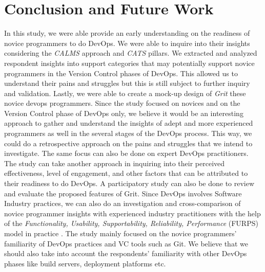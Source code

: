 \documentclass{sigchi}
\begin{document}
\section{Conclusion and Future Work}
In this study, we were able provide an early understanding on the readiness of novice programmers to do DevOps. We were able to inquire into their insights considering the \textit{CALMS} approach and \textit{CATS} pillars. We extracted and analyzed respondent insights into support categories that may potentially support novice programmers in the Version Control phases of DevOps. This allowed us to understand their pains and struggles but this is still subject to further inquiry and validation. Lastly, we were able to create a mock-up design of \textit{Grit} these novice devops programmers. Since the study focused on novices and on the Version Control phase of DevOps only, we believe it would be an interesting approach to gather and understand the insights of adept and more experienced programmers as well in the several stages of the DevOps process. This way, we could do a retrospective approach on the pains and struggles that we intend to investigate. The same focus can also be done on expert DevOps practitioners. The study can take another approach in inquiring into their perceived effectiveness, level of engagement, and other factors that can be attributed to their readiness to do DevOps. A participatory study can also be done to review and evaluate the proposed features of Grit. Since DevOps involves Software Industry practices, we can also do an investigation and cross-comparison of novice programmer insights with experienced industry practitioners with the help of the \textit{Functionality, Usability, Supportability, Reliability, Performance} (FURPS) model in practice \cite{al2010quality}.
The study mainly focused on the novice programmers' familiarity of DevOps practices and VC tools such as Git. We believe that we should also take into account the respondents' familiarity with other DevOps phases like build servers, deployment platforms etc. 
\balance{}


\end{document}
